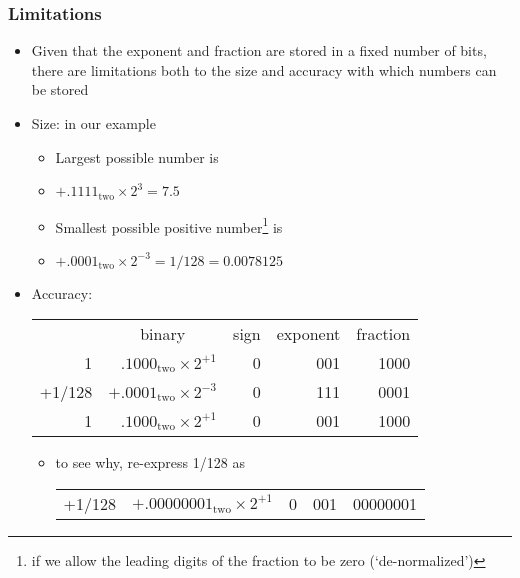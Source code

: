 \documentclass[11pt,a4paper]{article}
\newcommand{\bc}{\begin{center}}
\newcommand{\ec}{\end{center}}
\begin{document}
\begin{frame}[fragile]
	\frametitle{Limitations}

	\begin{itemize}
    \item Given that the exponent and fraction are stored in a fixed number of bits, there are limitations both to the size and accuracy with which numbers can be stored
    \item <2-> Size: in our example
    \begin{itemize}
        \item Largest possible number is 
				\item <3-> $+.1111_{\mbox{two}} \times 2^{3} = 7.5$
        \item <4-> Smallest possible positive number\footnote
        {if we allow the leading digits of the fraction to be zero (`de-normalized')}
        is 
				\item <5-> $+.0001_{\mbox{two}} \times 2^{-3} = 1/128 = 0.0078125$
    \end{itemize}
	\end{itemize}
\end{frame}
\begin{frame}
	\begin{itemize}
    \item Accuracy:
    \bc
    \begin{tabular}{rrrrr}
        & \multicolumn{1}{c}{binary} &
            \multicolumn{1}{c}{sign} & \multicolumn{1}{c}{exponent} &
            \multicolumn{1}{c}{fraction}\\
        1 & $.1000_{\mbox{two}} \times 2^{+1}$ &
            0 & 001 & 1000\\
        +1/128 & $+.0001_{\mbox{two}} \times 2^{-3}$ &
            0 & 111 & 0001\\
        \hline
        1 & $.1000_{\mbox{two}} \times 2^{+1}$ &
            0 & 001 & 1000
    \end{tabular}
    \ec
    \begin{itemize}
        \item to see why, re-express 1/128 as
		    \bc
		    \begin{tabular}{rrrrr}
		        +1/128 & $+.00000001_{\mbox{two}} \times 2^{+1}$ &
		            0 & 001 & 00000001\\
		    \end{tabular}
		    \ec
    \end{itemize}
	\end{itemize}
\end{frame}
\end{document}
